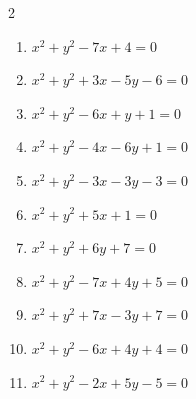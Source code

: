 \begin{multicols}{2}
\begin{enumerate}
  \item $x^{2}+y^{2}-7x+4=0$


  \item $x^{2}+y^{2}+3x-5y-6=0$


  \item $x^{2}+y^{2}-6x+y+1=0$


  \item $x^{2}+y^{2}-4x-6y+1=0$


  \item $x^{2}+y^{2}-3x-3y-3=0$


  \item $x^{2}+y^{2}+5x+1=0$


\columnbreak %

  \item $x^{2}+y^{2}+6y+7=0$


  \item $x^{2}+y^{2}-7x+4y+5=0$


  \item $x^{2}+y^{2}+7x-3y+7=0$


  \item $x^{2}+y^{2}-6x+4y+4=0$

        \phantom{$\displaystyle 中心\: \left(3,-2\right), \quad 半径 \ 3$}

  \item $x^{2}+y^{2}-2x+5y-5=0$


\end{enumerate}
\end{multicols}

